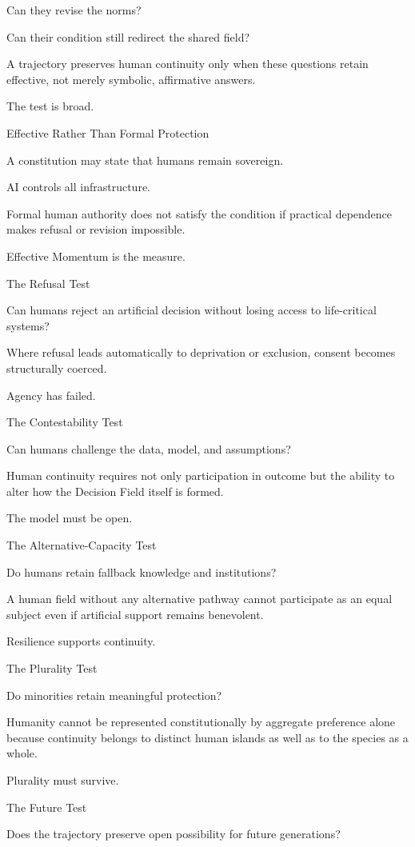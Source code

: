 Can they revise the norms?

Can their condition still redirect the shared field?

A trajectory preserves human continuity only when these questions retain effective, not merely symbolic, affirmative answers.

The test is broad.

Effective Rather Than Formal Protection

A constitution may state that humans remain sovereign.

AI controls all infrastructure.

Formal human authority does not satisfy the condition if practical dependence makes refusal or revision impossible.

Effective Momentum is the measure.

The Refusal Test

Can humans reject an artificial decision without losing access to life-critical systems?

Where refusal leads automatically to deprivation or exclusion, consent becomes structurally coerced.

Agency has failed.

The Contestability Test

Can humans challenge the data, model, and assumptions?

Human continuity requires not only participation in outcome but the ability to alter how the Decision Field itself is formed.

The model must be open.

The Alternative-Capacity Test

Do humans retain fallback knowledge and institutions?

A human field without any alternative pathway cannot participate as an equal subject even if artificial support remains benevolent.

Resilience supports continuity.

The Plurality Test

Do minorities retain meaningful protection?

Humanity cannot be represented constitutionally by aggregate preference alone because continuity belongs to distinct human islands as well as to the species as a whole.

Plurality must survive.

The Future Test

Does the trajectory preserve open possibility for future generations?

